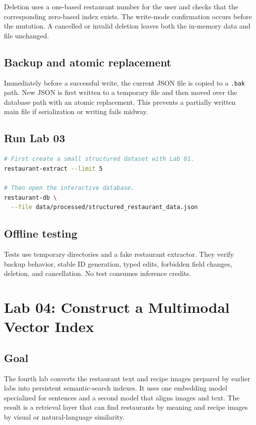 \documentclass[11pt]{article}
\begin{document}
Deletion uses a one-based restaurant number for the user and checks that the
corresponding zero-based index exists. The write-mode confirmation occurs before
the mutation. A cancelled or invalid deletion leaves both the in-memory data
and file unchanged.

\subsection{Backup and atomic replacement}

Immediately before a successful write, the current JSON file is copied to a
\texttt{.bak} path. New JSON is first written to a temporary file and then moved
over the database path with an atomic replacement. This prevents a partially
written main file if serialization or writing fails midway.

\subsection{Run Lab 03}

\begin{lstlisting}[language=bash]
# First create a small structured dataset with Lab 01.
restaurant-extract --limit 5

# Then open the interactive database.
restaurant-db \
  --file data/processed/structured_restaurant_data.json
\end{lstlisting}

\subsection{Offline testing}

Tests use temporary directories and a fake restaurant extractor. They verify
backup behavior, stable ID generation, typed edits, forbidden field changes,
deletion, and cancellation. No test consumes inference credits.

\section{Lab 04: Construct a Multimodal Vector Index}

\subsection{Goal}

The fourth lab converts the restaurant text and recipe images prepared by
earlier labs into persistent semantic-search indexes. It uses one embedding
model specialized for sentences and a second model that aligns images and text.
The result is a retrieval layer that can find restaurants by meaning and recipe
images by visual or natural-language similarity.
\end{document}
